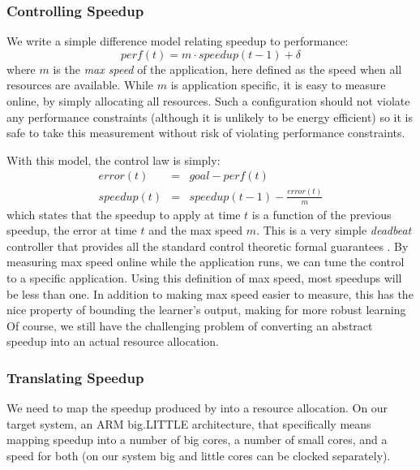 \subsubsection{Controlling Speedup}
We write a simple difference model relating speedup to performance:
\begin{equation}
  perf(t) = m \cdot speedup(t-1) + \delta \label{eqn:speedup}
\end{equation}
where $m$ is the \emph{max speed} of the application, here defined as
the speed when all resources are available.  While $m$ is application
specific, it is easy to measure online, by simply allocating all
resources. Such a configuration should not violate any performance
constraints (although it is unlikely to be energy efficient) so it is
safe to take this measurement without risk of violating performance
constraints.

With this model, the control law is simply:
\begin{eqnarray}
  error(t) &=& goal - perf(t) \label{eqn:speedup-error} \\
  speedup(t) &=& speedup(t-1) - \frac{error(t)}{m}
  \label{eqn:speedup-control}
\end{eqnarray}
which states that the speedup to apply at time $t$ is a function of
the previous speedup, the error at time $t$ and the max speed $m$.
This is a very simple \emph{deadbeat} controller that provides all the
standard control theoretic formal guarantees
\cite{seec-cdc2010,ICSE2014}.  By measuring max speed online while the
application runs, we can tune the control to a specific application.
Using this definition of max speed, most speedups will be less than
one.  In addition to making max speed easier to measure, this has the
nice property of bounding the learner's output, making for more robust
learning  Of course, we still have the challenging problem of
converting an abstract speedup into an actual resource allocation.


\subsubsection{Translating Speedup}
We need to map the speedup produced by  into a
resource allocation.  On our target system, an ARM big.LITTLE
architecture, that specifically means mapping speedup into a number of
big cores, a number of small cores, and a speed for both (on our
system big and little cores can be clocked separately).

